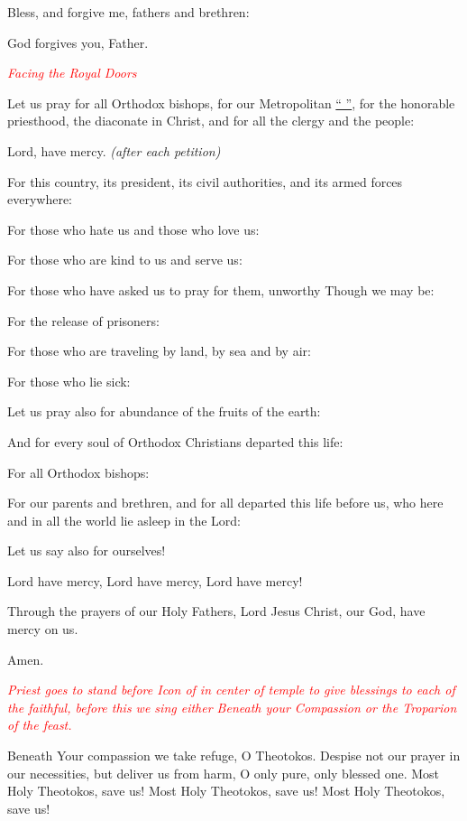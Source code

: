 \noindent{}Bless, and forgive me, fathers and brethren:

\noindent{}God forgives you, Father.

\noindent
\textcolor{red}{\textit{Facing the Royal Doors}}

\begin{hang}
\noindent{}Let us pray for all Orthodox bishops, for our Metropolitan \underline{``          ''}, for the honorable priesthood, the diaconate in Christ, and for all the clergy and the people:

\end{hang}

\noindent{}Lord, have mercy. \textit{(after each petition)}

\begin{hang}
\noindent{}For this country, its president, its civil 
authorities, and its armed forces everywhere:

For those who hate us and those who love us:

For those who are kind to us and serve us:

For those who have asked us to pray for them, unworthy Though we may be:

For the release of prisoners:

For those who are traveling by land, by sea and by air:

For those who lie sick:

Let us pray also for abundance of the fruits of the earth:

And for every soul of Orthodox Christians departed this life:

For all Orthodox bishops:

For our parents and brethren, and for all departed this life before us, who here and in all the world lie asleep in the Lord:

Let us say also for ourselves!

\end{hang}

\begin{hang}
\noindent{}Lord have mercy, Lord have mercy, Lord have 
mercy!

\end{hang}

\begin{hang}
\noindent{}Through the prayers of our Holy Fathers, 
Lord Jesus Christ, our God, have mercy on us.

\end{hang}

\noindent{}Amen.

\noindent
\textcolor{red}{\textit{Priest goes to stand before Icon of in center of temple to give blessings to each of the faithful, before this we sing either Beneath your Compassion or the Troparion of the feast.}}

\noindent
Beneath Your compassion we take refuge, O Theotokos. Despise not our prayer in our necessities, but deliver us from harm, O only pure, only blessed one. Most Holy Theotokos, save us! Most Holy Theotokos, save us! Most Holy Theotokos, save us!